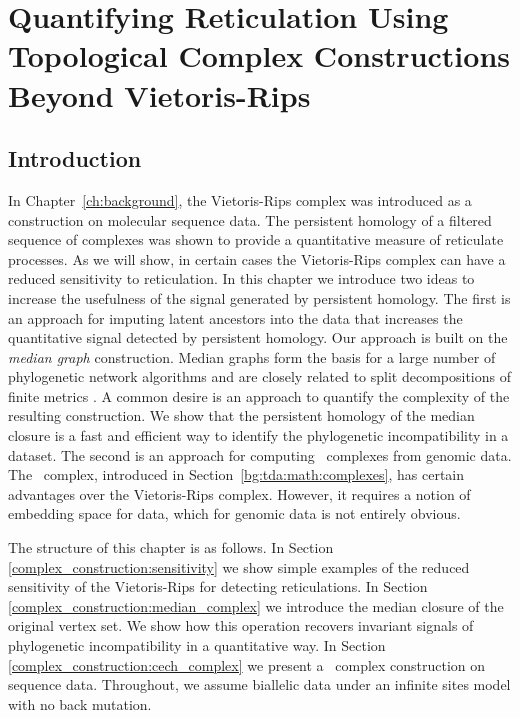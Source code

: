 \chapter{Quantifying Reticulation Using Topological Complex Constructions Beyond Vietoris-Rips}
\label{ch:complex_construction}

\section{Introduction}
\label{complex_construction:introduction}

In Chapter~\ref{ch:background}, the Vietoris-Rips complex was introduced as a construction on molecular sequence data.
The persistent homology of a filtered sequence of complexes was shown to provide a quantitative measure of reticulate processes.
As we will show, in certain cases the Vietoris-Rips complex can have a reduced sensitivity to reticulation.
In this chapter we introduce two ideas to increase the usefulness of the signal generated by persistent homology.
The first is an approach for imputing latent ancestors into the data that increases the quantitative signal detected by persistent homology.
Our approach is built on the \emph{median graph} construction.
Median graphs form the basis for a large number of phylogenetic network algorithms and are closely related to split decompositions of finite metrics \cite{Bandelt:1999,Bandelt:1992}.
A common desire is an approach to quantify the complexity of the resulting construction.
We show that the persistent homology of the median closure is a fast and efficient way to identify the phylogenetic incompatibility in a dataset.
The second is an approach for computing \Cech\ complexes from genomic data.
The \Cech\ complex, introduced in Section~\ref{bg:tda:math:complexes}, has certain advantages over the Vietoris-Rips complex.
However, it requires a notion of embedding space for data, which for genomic data is not entirely obvious.

The structure of this chapter is as follows.
In Section \ref{complex_construction:sensitivity} we show simple examples of the reduced sensitivity of the Vietoris-Rips for detecting reticulations.
In Section \ref{complex_construction:median_complex} we introduce the median closure of the original vertex set.
We show how this operation recovers invariant signals of phylogenetic incompatibility in a quantitative way.
In Section \ref{complex_construction:cech_complex} we present a \Cech\ complex construction on sequence data.
Throughout, we assume biallelic data under an infinite sites model with no back mutation.

